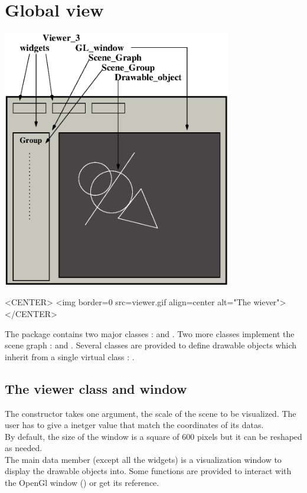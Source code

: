 \section{Global view}
\begin{ccTexOnly}
\begin{center}
\includegraphics[width=10cm]{viewer.eps}
\end{center}
\end{ccTexOnly}
\begin{ccHtmlOnly}
<CENTER>
<img border=0 src=viewer.gif align=center alt="The wiever"> 
</CENTER>
\end{ccHtmlOnly}



The package contains two major classes :  and 
. Two more classes implement the scene graph :  and . Several classes are provided to
define drawable objects which inherit from a single virtual class :
. 

\subsection{The viewer class and window}

The  constructor takes one argument, the scale of the scene to
be visualized. The user has to give a inetger value that match the
coordinates of its datas. 
\\
By default, the size of the window is a square of 600
pixels but it can be reshaped as needed. \\
The main data member (except all the widgets) is a 
visualization window to
display the drawable objects into. Some functions are provided to interact
with the OpenGl window () or get its reference.

